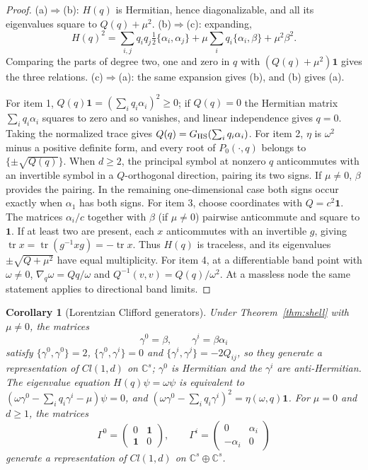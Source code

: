 \documentclass[12pt]{article}
\newtheorem{corollary}[theorem]{Corollary}
\theoremstyle{definition}
\theoremstyle{remark}
\newcommand{\tr}{\operatorname{tr}}
\begin{document}
\begin{proof}
(a)$\Rightarrow$(b): $H(q)$ is Hermitian, hence diagonalizable, and all its eigenvalues square to $Q(q)+\mu^2$. (b)$\Rightarrow$(c): expanding,
\[
H(q)^2=\sum_{i,j}q_iq_j\tfrac12\{\alpha_i,\alpha_j\}+\mu\sum_iq_i\{\alpha_i,\beta\}+\mu^2\beta^2 .
\]
Comparing the parts of degree two, one and zero in $q$ with $(Q(q)+\mu^2)\mathbf 1$ gives the three relations. (c)$\Rightarrow$(a): the same expansion gives (b), and (b) gives (a).

For item 1, $Q(q)\mathbf 1=(\sum_iq_i\alpha_i)^2\ge0$; if $Q(q)=0$ the Hermitian matrix $\sum_iq_i\alpha_i$ squares to zero and so vanishes, and linear independence gives $q=0$. Taking the normalized trace gives $Q(q)=G_{\rm HS}(\sum_iq_i\alpha_i)$. For item 2, $\eta$ is $\omega^2$ minus a positive definite form, and every root of $P_0(\cdot,q)$ belongs to $\{\pm\sqrt{Q(q)}\}$. When $d\ge2$, the principal symbol at nonzero $q$ anticommutes with an invertible symbol in a $Q$-orthogonal direction, pairing its two signs. If $\mu\ne0$, $\beta$ provides the pairing. In the remaining one-dimensional case both signs occur exactly when $\alpha_1$ has both signs. For item 3, choose coordinates with $Q=c^2\mathbf 1$. The matrices $\alpha_i/c$ together with $\beta$ (if $\mu\neq0$) pairwise anticommute and square to $\mathbf 1$. If at least two are present, each $x$ anticommutes with an invertible $g$, giving $\tr x=\tr(g^{-1}xg)=-\tr x$. Thus $H(q)$ is traceless, and its eigenvalues $\pm\sqrt{Q+\mu^2}$ have equal multiplicity. For item 4, at a differentiable band point with $\omega\ne0$, $\nabla_q\omega=Qq/\omega$ and $Q^{-1}(v,v)=Q(q)/\omega^2$. At a massless node the same statement applies to directional band limits.
\end{proof}

\begin{corollary}[Lorentzian Clifford generators]
\label{cor:gamma}
Under Theorem~\ref{thm:shell} with $\mu\ne0$, the matrices
\begin{equation}
\gamma^0=\beta,\qquad \gamma^i=\beta\alpha_i
\end{equation}
satisfy $\{\gamma^0,\gamma^0\}=2$, $\{\gamma^0,\gamma^i\}=0$ and $\{\gamma^i,\gamma^j\}=-2Q_{ij}$, so they generate a representation of $Cl(1,d)$ on $\mathbb C^s$; $\gamma^0$ is Hermitian and the $\gamma^i$ are anti-Hermitian. The eigenvalue equation $H(q)\psi=\omega\psi$ is equivalent to $(\omega\gamma^0-\sum_iq_i\gamma^i-\mu)\psi=0$, and $(\omega\gamma^0-\sum_iq_i\gamma^i)^2=\eta(\omega,q)\mathbf 1$. For $\mu=0$ and $d\ge1$, the matrices
\begin{equation}
\Gamma^0=\begin{pmatrix}0&\mathbf 1\\ \mathbf 1&0\end{pmatrix},\qquad
\Gamma^i=\begin{pmatrix}0&\alpha_i\\ -\alpha_i&0\end{pmatrix}
\end{equation}
generate a representation of $Cl(1,d)$ on $\mathbb C^s\oplus\mathbb C^s$.
\end{corollary}
\end{document}
